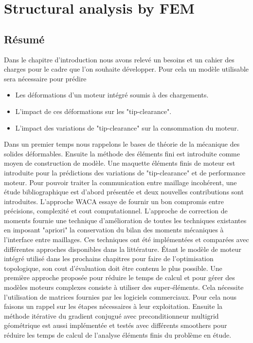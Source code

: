 \chapter{Structural analysis by FEM }
\label{chap:1}
\minitoc
\begin{mdframed}[hidealllines=true,backgroundcolor=lightgray!20]
\section*{Résumé}
Dans le chapitre d'introduction nous avons relevé un besoins et un cahier des charges pour le cadre que l'on souhaite développer. Pour cela un modèle utilisable sera nécessaire pour prédire
\begin{itemize}
\item Les déformations d'un moteur intégré soumis à des chargements.
\item L'impact de ces déformations sur les "tip-clearance".
\item L'impact des variations de "tip-clearance" sur la consommation du moteur.
\end{itemize}
Dans un premier temps nous rappelons le bases de théorie de la mécanique des solides déformables. Ensuite la méthode des éléments fini est introduite comme moyen de construction de modèle. Une maquette éléments finis de moteur est introduite pour la prédictions des variations de "tip-clearance" et de performance moteur. Pour pouvoir traiter la communication entre maillage incohérent, une étude bibliographique est d'abord présentée et deux nouvelles contributions sont introduites. L'approche WACA essaye de fournir un bon compromis entre précisions, complexité et cout computationnel. L'approche de correction de moments fournie une technique d'amélioration de toutes les techniques existantes en imposant "apriori" la conservation du bilan des moments mécaniques à l'interface entre maillages. Ces techniques ont été implémentées et comparées avec différentes approches disponibles dans la littérature.
Étant le modèle de moteur intégré utilisé dans les prochains chapitres pour faire de l'optimisation topologique, son cout d'évaluation doit être contenu le plus possible. Une première approche proposée pour réduire le temps de calcul et pour gérer des modèles moteurs complexes consiste à utiliser des super-éléments. Cela nécessite l'utilisation de matrices fournies par les logiciels commerciaux. Pour cela nous faisons un rappel sur les étapes nécessaires à leur exploitation. Ensuite la méthode itérative du gradient conjugué avec preconditionneur multigrid géométrique est aussi implémentée et testés avec différents smoothers pour réduire les temps de calcul de l'analyse éléments finis du problème en étude. 
\end{mdframed}
